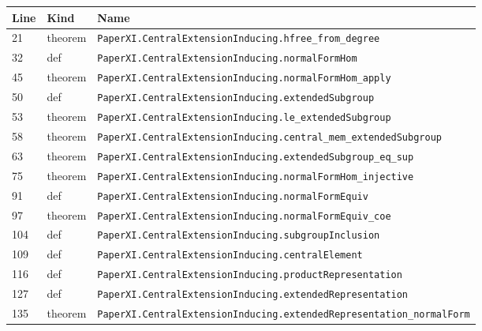 \documentclass[10pt,oneside]{book}
\begin{document}
\begin{longtable}{@{}p{}p{}p{}@{}}\toprule Line&Kind&Name\\\midrule\endhead

21&theorem&\nolinkurl{PaperXI.CentralExtensionInducing.hfree_from_degree}\\

32&def&\nolinkurl{PaperXI.CentralExtensionInducing.normalFormHom}\\

45&theorem&\nolinkurl{PaperXI.CentralExtensionInducing.normalFormHom_apply}\\

50&def&\nolinkurl{PaperXI.CentralExtensionInducing.extendedSubgroup}\\

53&theorem&\nolinkurl{PaperXI.CentralExtensionInducing.le_extendedSubgroup}\\

58&theorem&\nolinkurl{PaperXI.CentralExtensionInducing.central_mem_extendedSubgroup}\\

63&theorem&\nolinkurl{PaperXI.CentralExtensionInducing.extendedSubgroup_eq_sup}\\

75&theorem&\nolinkurl{PaperXI.CentralExtensionInducing.normalFormHom_injective}\\

91&def&\nolinkurl{PaperXI.CentralExtensionInducing.normalFormEquiv}\\

97&theorem&\nolinkurl{PaperXI.CentralExtensionInducing.normalFormEquiv_coe}\\

104&def&\nolinkurl{PaperXI.CentralExtensionInducing.subgroupInclusion}\\

109&def&\nolinkurl{PaperXI.CentralExtensionInducing.centralElement}\\

116&def&\nolinkurl{PaperXI.CentralExtensionInducing.productRepresentation}\\

127&def&\nolinkurl{PaperXI.CentralExtensionInducing.extendedRepresentation}\\

135&theorem&\nolinkurl{PaperXI.CentralExtensionInducing.extendedRepresentation_normalForm}\\


\end{longtable}
\end{document}
